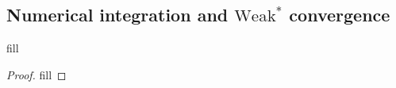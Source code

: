 \subsection{Numerical integration and $\text{Weak}^\ast$ convergence}

\begin{exercise}{1}
fill
\end{exercise}
\begin{proof}
fill
\end{proof}